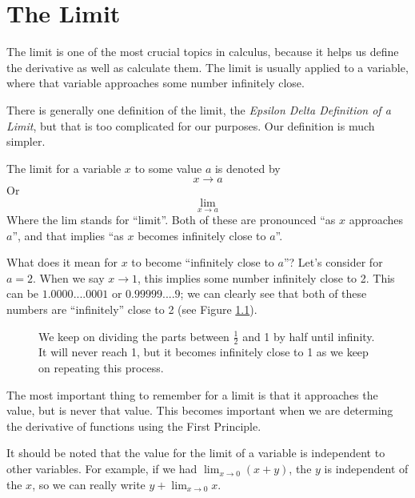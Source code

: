\documentclass[working]{tuftebook}
\begin{document}
\chapter{The Limit}
\vspace{-2em}
The limit is one of the most crucial topics in calculus, because it helps us define the derivative as well as calculate them. The limit is usually applied to a variable, where that variable approaches some number infinitely close.

There is generally one definition of the limit, the \emph{Epsilon Delta Definition of a Limit}, but that is too complicated for our purposes. Our definition is much simpler.

\begin{definition}
    The limit for a variable $x$ to some value $a$ is denoted by 
    \[
        x\to a
    \]
    Or
    \[
        \lim_{x\to a}
    \]
    Where the lim stands for ``limit''. Both of these are pronounced ``as $x$ approaches $a$'', and that implies ``as $x$ becomes infinitely close to $a$''.
\end{definition}

What does it mean for $x$ to become ``infinitely close to $a$''? Let's consider for $a=2$. When we say $x\to 1$, this implies some number infinitely close to 2. This can be $1.0000....0001$ or $0.99999....9$; we can clearly see that both of these numbers are ``infinitely'' close to 2 (see Figure \ref{fig:infinitely-close}).  

\begin{figure}[ht]
    \centering
    \caption{We keep on dividing the parts between $ \frac{1}{2}$ and 1 by half until infinity. It will never reach 1, but it becomes infinitely close to 1 as we keep on repeating this process.}
    \label{fig:infinitely-close}
\end{figure}

The most important thing to remember for a limit is that it approaches the value, but is never that value. This becomes important when we are determing the derivative of functions using the First Principle.

It should be noted that the value for the limit of a variable is independent to other variables. For example, if we had $\displaystyle \lim_{x\to 0}(x+y)$, the $y$ is independent of the $x$, so we can really write $\displaystyle y+\lim_{x\to 0}x$.
\end{document}

